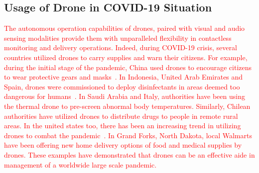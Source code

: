 \subsection{Usage of Drone in COVID-19 Situation}
\textcolor{red}{
The autonomous operation capabilities of drones, paired with visual and audio sensing modalities provide them with unparalleled flexibility in contactless monitoring and delivery operations. Indeed, during COVID-19 crisis, 
}
\textcolor{red}{
several countries utilized drones to carry supplies and warn their citizens. For example, during the initial stage of the pandemic, China used drones to encourage citizens to wear protective gears and masks~\cite{dronefortune}.
In Indonesia, United Arab Emirates and Spain, drones were commissioned to deploy disinfectants in areas deemed too dangerous for humans~\cite{dronefortune}.
In Saudi Arabia and Italy, authorities have been using the thermal drone to pre-screen abnormal body temperatures. Similarly, Chilean authorities have utilized drones to distribute drugs to people in remote rural areas. In the united states too, there has been an increasing trend in utilizing drones to combat the pandemic~\cite{dronefortune}. In Grand Forks, North Dakota, local Walmarts have been offering new home delivery options of food and medical supplies by drones. These examples have demonstrated that drones can be an effective aide in management of a worldwide large scale pandemic.
}

